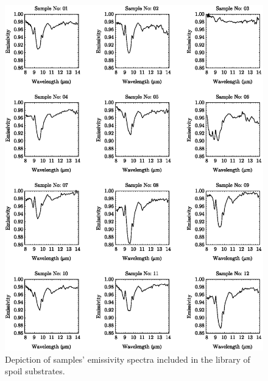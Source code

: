 \begin{appendices}
\begin{figure}[!t]
\centering
\includegraphics[width=0.95\linewidth]{pics/Chapter_05/spectral_library_pt1.eps}
\vspace{1.5 em}
\caption{Depiction of samples' emissivity spectra included in the library of spoil substrates.}
\label{fig:SpoilSubstratesPreviewPt1}
\end{figure}


\end{appendices}
